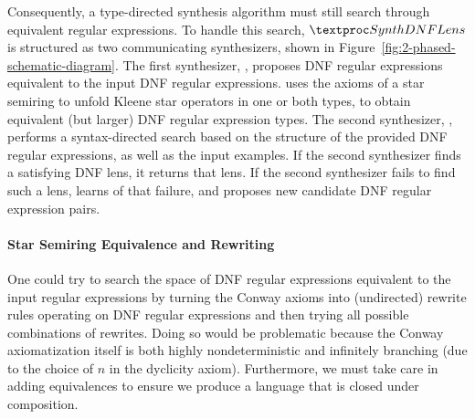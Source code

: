\documentclass[acmsmall]{acmart}
\begin{document}
Consequently, a type-directed synthesis algorithm must still search through
equivalent regular expressions.
To handle this search, $\SynthDNFLens{}$ is structured as two
communicating synthesizers, shown in Figure~\ref{fig:2-phased-schematic-diagram}.
The first synthesizer, \TypeProp{}, proposes DNF regular expressions
equivalent to the input DNF regular expressions.
\TypeProp{} uses the axioms of a star semiring to unfold Kleene star
operators in one or both types, to obtain equivalent (but larger) DNF regular
expression types. The second synthesizer, \RigidSynth{}, performs a
syntax-directed search based on the structure of the provided DNF regular
expressions, as well as the input examples. If the second synthesizer finds a
satisfying DNF lens, it returns that lens.  If the second synthesizer fails to
find such a lens, \TypeProp{} learns of that failure,
and proposes new candidate DNF regular expression pairs.

\paragraph*{Star Semiring Equivalence and Rewriting}

One could try to search the space of DNF regular expressions equivalent to
the input regular expressions by turning the Conway axioms into (undirected)
rewrite rules operating on DNF regular expressions
and then trying all possible combinations of rewrites.  Doing so would
be problematic because the Conway axiomatization itself is both highly
nondeterministic and infinitely branching (due to the choice of $n$ in
the dyclicity axiom).  Furthermore, we must take care in adding
equivalences to ensure we produce a language that is closed under
composition.
\end{document}
